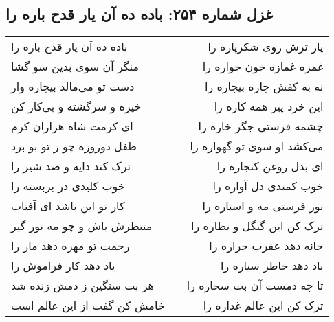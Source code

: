 \begin{center}
\section*{غزل شماره ۲۵۴: باده ده آن یار قدح باره را}
\label{sec:0254}
\begin{longtable}{l p{0.5cm} r}
باده ده آن یار قدح باره را
&&
یار ترش روی شکرپاره را
\\
منگر آن سوی بدین سو گشا
&&
غمزه غمازه خون خواره را
\\
دست تو می‌مالد بیچاره وار
&&
نه به کفش چاره بیچاره را
\\
خیره و سرگشته و بی‌کار کن
&&
این خرد پیر همه کاره را
\\
ای کرمت شاه هزاران کرم
&&
چشمه فرستی جگر خاره را
\\
طفل دوروزه چو ز تو بو برد
&&
می‌کشد او سوی تو گهواره را
\\
ترک کند دایه و صد شیر را
&&
ای بدل روغن کنجاره را
\\
خوب کلیدی در بربسته را
&&
خوب کمندی دل آواره را
\\
کار تو این باشد ای آفتاب
&&
نور فرستی مه و استاره را
\\
منتظرش باش و چو مه نور گیر
&&
ترک کن این گنگل و نظاره را
\\
رحمت تو مهره دهد مار را
&&
خانه دهد عقرب جراره را
\\
یاد دهد کار فراموش را
&&
باد دهد خاطر سیاره را
\\
هر بت سنگین ز دمش زنده شد
&&
تا چه دمست آن بت سحاره را
\\
خامش کن گفت از این عالم است
&&
ترک کن این عالم غداره را
\\
\end{longtable}
\end{center}
